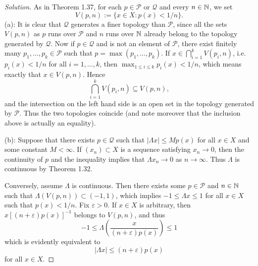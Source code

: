 \begin{proof}[Solution]
	As in Theorem 1.37, for each $p \in \mathscr{P}$ or $\mathscr{Q}$ and every $n\in\mathbb{N}$, we set
	\begin{equation*}
		V(p,n) := \{x \in X : p(x) < 1/n\}.
	\end{equation*}
	(a): It is clear that $\mathscr{Q}$ generates a finer topology than $\mathscr{P}$, since all the sets $V(p,n)$ as $p$ runs over $\mathscr{P}$ and $n$ runs over $\mathbb{N}$ already belong to the topology generated by $\mathscr{Q}$. Now if $p \in \mathscr{Q}$ and is not an element of $\mathscr{P}$, there exist finitely many $p_1, \ldots, p_k \in \mathscr{P}$ such that $p = \max(p_1, \ldots, p_k)$. If $x \in \bigcap_{i=1}^k V(p_i, n)$, i.e.\ $p_i(x) < 1/n$ for all $i=1,\ldots,k$, then $\max_{1\le i\le k}p_i(x) < 1/n$, which means exactly that $x \in V(p,n)$. Hence
	\begin{equation*}
		\bigcap_{i=1}^k V(p_i,n) \subseteq V(p,n),
	\end{equation*}
	and the intersection on the left hand side is an open set in the topology generated by $\mathscr{P}$. Thus the two topologies coincide (and note moreover that the inclusion above is actually an equality).
	
	(b): Suppose that there exists $p \in \mathscr{Q}$ such that $|\Lambda x| \le Mp(x)$ for all $x \in X$ and some constant $M<\infty$. If $(x_n) \subset X$ is a sequence satisfying $x_n \to 0$, then the continuity of $p$ and the inequality implies that $\Lambda x_n \to 0$ as $n \to \infty$. Thus $\Lambda$ is continuous by Theorem 1.32.
	
	Conversely, assume $\Lambda$ is continuous. Then there exists some $p\in\mathscr{P}$ and $n\in\mathbb{N}$ such that $\Lambda(V(p,n)) \subset (-1,1)$, which implies $-1 \le \Lambda x \le 1$ for all $x \in X$ such that $p(x)<1/n$. Fix $\varepsilon > 0$. If $x\in X$ is arbitrary, then $x[(n+\varepsilon)p(x)]^{-1}$ belongs to $V(p,n)$, and thus
	\begin{equation*}
		-1 \le \Lambda\left(\frac{x}{(n+\varepsilon)p(x)}\right) \le 1
	\end{equation*}
	which is evidently equivalent to
	\begin{equation*}
		|\Lambda x| \le (n+\varepsilon)p(x)
	\end{equation*}
	for all $x\in X$.
\end{proof}